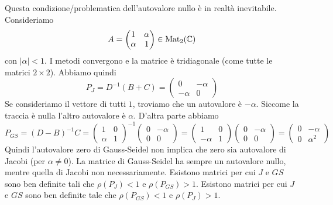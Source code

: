 \documentclass[a4paper]{article}
\begin{document}
Questa condizione/problematica dell'autovalore nullo è in realtà inevitabile.
Consideriamo
\[
    A =
    \begin{pmatrix}
        1 & \alpha \\ \alpha & 1
    \end{pmatrix} \in \operatorname{Mat}_2(\mathbb{C})
\]
con \(|\alpha|<1\). I metodi convergono
e la matrice è tridiagonale (come tutte le matrici \(2\times 2\)).
Abbiamo quindi
\[
    P_J = D^{-1}(B + C) =
    \begin{pmatrix}
        0 & -\alpha \\ -\alpha & 0
    \end{pmatrix}
\]
Se consideriamo il vettore di tutti \(1\), troviamo che un autovalore è
\(-\alpha\). Siccome la traccia è nulla l'altro autovalore è \(\alpha\).
D'altra parte abbiamo \[
    P_{GS} = (D-B)^{-1}C =
    \begin{pmatrix}
        1 & 0 \\ \alpha & 1
    \end{pmatrix}^{-1}
    \begin{pmatrix}
        0 & -\alpha \\ 0 & 0
    \end{pmatrix}
    =
    \begin{pmatrix}
        1 & 0 \\ -\alpha & 1
    \end{pmatrix}
    \begin{pmatrix}
        0 & -\alpha \\ 0 & 0
    \end{pmatrix}
    =
    \begin{pmatrix}
        0 & -\alpha \\ 0 & \alpha^2
    \end{pmatrix}
\]
Quindi l'autovalore zero di Gauss-Seidel non implica che zero sia autovalore di Jacobi (per \(\alpha\neq 0\)).
La matrice di Gauss-Seidel ha sempre un autovalore nullo,
mentre quella di Jacobi non necessariamente.
Esistono matrici per cui \(J\) e \(GS\) sono ben definite tali che \(\rho(P_J) < 1\)
e \(\rho(P_{GS}) > 1\).
Esistono matrici per cui \(J\) e \(GS\) sono ben definite tale che
\(\rho(P_{GS}) < 1\) e \(\rho(P_J) > 1\).
\end{document}
